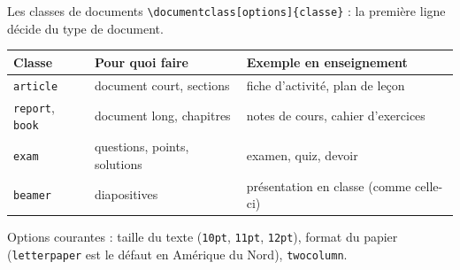 \begin{frame}{Les classes de documents}
  \small \texttt{\textbackslash documentclass[options]\{classe\}} : la
  première ligne décide du type de document.
  \begin{center}
  \begin{tabular}{lll}
    \toprule
    Classe & Pour quoi faire & Exemple en enseignement \\
    \midrule
    \texttt{article} & document court, sections & fiche d'activité,
      plan de leçon \\
    \texttt{report}, \texttt{book} & document long, chapitres & notes de
      cours, cahier d'exercices \\
    \texttt{exam} & questions, points, solutions & examen, quiz,
      devoir \\
    \texttt{beamer} & diapositives & présentation en classe (comme
      celle-ci) \\
    \bottomrule
  \end{tabular}
  \end{center}
  \vspace{4pt}
  Options courantes : taille du texte (\texttt{10pt}, \texttt{11pt},
  \texttt{12pt}), format du papier (\texttt{letterpaper} est le défaut en
  Amérique du Nord), \texttt{twocolumn}.
\end{frame}

